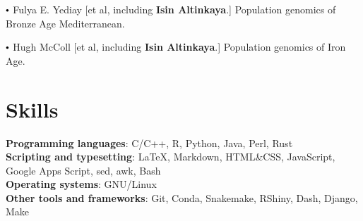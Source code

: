 \documentclass[letterpaper,10.5pt]{article}
\newcommand\sbullet[1][.5]{\mathbin{\vcenter{\hbox{\scalebox{#1}{$\bullet$}}}}}
\begin{document}
$\sbullet[.6]$ \hspace{0.74cm}  Fulya E. Yediay [et al, including \textbf{Isin Altinkaya}.]  Population genomics of Bronze Age Mediterranean. \\
\smallskip

$\sbullet[.6]$ \hspace{0.74cm}  Hugh McColl [et al, including \textbf{Isin Altinkaya}.]  Population genomics of Iron Age. \\



\section{Skills}
\textbf{Programming languages}: C/C++, R, Python, Java, Perl, Rust \\
\textbf{Scripting and typesetting}: \LaTeX, Markdown, HTML\&CSS, JavaScript, Google Apps Script, sed, awk, Bash \\
\textbf{Operating systems}: GNU/Linux \\
\textbf{Other tools and frameworks}: Git, Conda, Snakemake, RShiny, Dash, Django, Make \\



\end{document}
